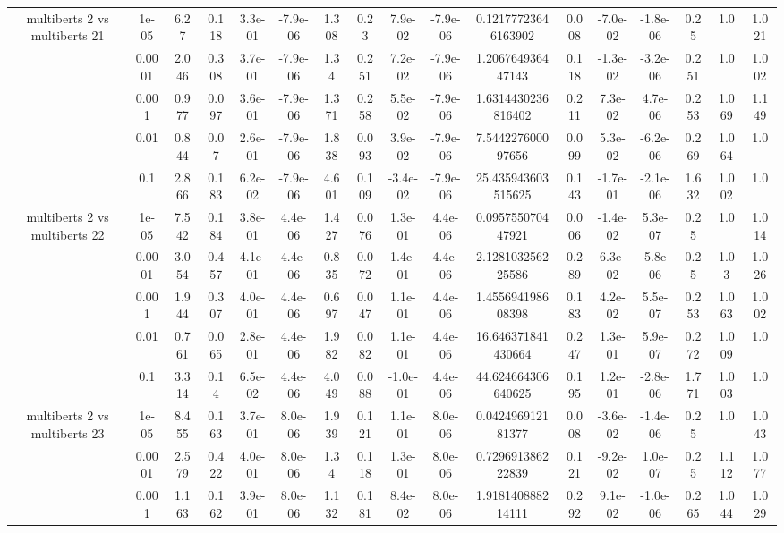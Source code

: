 \begin{tabular}{|c|c|c|c|c|c|c|c|c|c|c|c|c|c|c|c|c|}
\hline
\multirow{5}{*}{multiberts 2 vs multiberts 21} & 1e-05 & 6.27 & 0.118 & 3.3e-01 & -7.9e-06 & 1.308 & 0.23 & 7.9e-02 & -7.9e-06 & 0.12177723646163902 & 0.008 & -7.0e-02 & -1.8e-06 & 0.25 & 1.0 & 1.021 \\
 & 0.0001 & 2.046 & 0.308 & 3.7e-01 & -7.9e-06 & 1.34 & 0.251 & 7.2e-02 & -7.9e-06 & 1.206764936447143 & 0.118 & -1.3e-02 & -3.2e-06 & 0.251 & 1.0 & 1.002 \\
 & 0.001 & 0.977 & 0.097 & 3.6e-01 & -7.9e-06 & 1.371 & 0.258 & 5.5e-02 & -7.9e-06 & 1.6314430236816402 & 0.211 & 7.3e-02 & 4.7e-06 & 0.253 & 1.069 & 1.149 \\
 & 0.01 & 0.844 & 0.07 & 2.6e-01 & -7.9e-06 & 1.838 & 0.093 & 3.9e-02 & -7.9e-06 & 7.544227600097656 & 0.099 & 5.3e-02 & -6.2e-06 & 0.269 & 1.064 & 1.0 \\
 & 0.1 & 2.866 & 0.183 & 6.2e-02 & -7.9e-06 & 4.601 & 0.109 & -3.4e-02 & -7.9e-06 & 25.435943603515625 & 0.143 & -1.7e-01 & -2.1e-06 & 1.632 & 1.002 & 1.0 \\
\hline
\multirow{5}{*}{multiberts 2 vs multiberts 22} & 1e-05 & 7.542 & 0.184 & 3.8e-01 & 4.4e-06 & 1.427 & 0.076 & 1.3e-01 & 4.4e-06 & 0.095755070447921 & 0.006 & -1.4e-02 & 5.3e-07 & 0.25 & 1.0 & 1.014 \\
 & 0.0001 & 3.054 & 0.457 & 4.1e-01 & 4.4e-06 & 0.835 & 0.072 & 1.4e-01 & 4.4e-06 & 2.128103256225586 & 0.289 & 6.3e-02 & -5.8e-06 & 0.25 & 1.03 & 1.026 \\
 & 0.001 & 1.944 & 0.307 & 4.0e-01 & 4.4e-06 & 0.697 & 0.047 & 1.1e-01 & 4.4e-06 & 1.455694198608398 & 0.183 & 4.2e-02 & 5.5e-07 & 0.253 & 1.063 & 1.002 \\
 & 0.01 & 0.761 & 0.065 & 2.8e-01 & 4.4e-06 & 1.982 & 0.082 & 1.1e-01 & 4.4e-06 & 16.646371841430664 & 0.247 & 1.3e-01 & 5.9e-07 & 0.272 & 1.009 & 1.0 \\
 & 0.1 & 3.314 & 0.14 & 6.5e-02 & 4.4e-06 & 4.049 & 0.088 & -1.0e-01 & 4.4e-06 & 44.624664306640625 & 0.195 & 1.2e-01 & -2.8e-06 & 1.771 & 1.003 & 1.0 \\
\hline
\multirow{5}{*}{multiberts 2 vs multiberts 23} & 1e-05 & 8.455 & 0.163 & 3.7e-01 & 8.0e-06 & 1.939 & 0.121 & 1.1e-01 & 8.0e-06 & 0.042496912181377 & 0.008 & -3.6e-02 & -1.4e-06 & 0.25 & 1.0 & 1.043 \\
 & 0.0001 & 2.579 & 0.422 & 4.0e-01 & 8.0e-06 & 1.34 & 0.118 & 1.3e-01 & 8.0e-06 & 0.729691386222839 & 0.121 & -9.2e-02 & 1.0e-07 & 0.25 & 1.112 & 1.077 \\
 & 0.001 & 1.163 & 0.162 & 3.9e-01 & 8.0e-06 & 1.132 & 0.181 & 8.4e-02 & 8.0e-06 & 1.918140888214111 & 0.292 & 9.1e-02 & -1.0e-06 & 0.265 & 1.044 & 1.029 \\

\end{tabular}
